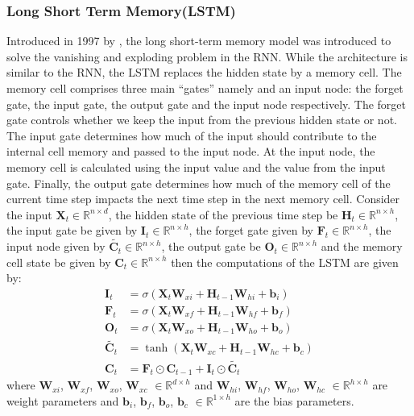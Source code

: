 \subsubsection*{Long Short Term Memory(LSTM)}
Introduced in 1997 by \cite{Hochreiter1997}, the long short-term memory model was introduced to solve the vanishing and exploding problem in the RNN. While the architecture is similar to the RNN, the LSTM replaces the hidden state by a memory cell. The memory cell comprises three main “gates” namely and an input node: the forget gate, the input gate, the output gate  and the input node respectively. The forget gate controls whether we keep the input from the previous hidden state or not.  The input gate determines how much of the input should contribute to the internal cell memory and passed to the input node. At the input node, the memory cell is calculated using the input value and the value from the input gate. Finally, the output gate determines how much of the memory cell of the current time step impacts the next time step in the next memory cell. Consider the input $\mathbf{X}_t \in \mathbb{R}^{n \times d}$, the hidden state of the previous time step be  $\mathbf{H}_t \in \mathbb{R}^{n \times h}$, the input gate be given by $\mathbf{I}_t \in \mathbb{R}^{n \times h}$, the forget gate given by $\mathbf{F}_t \in \mathbb{R}^{n \times h}$, the input node given by $\tilde{\mathbf{C}_t} \in \mathbb{R}^{n \times h}$,  the output gate be $\mathbf{O}_t \in \mathbb{R}^{n \times h}$ and the memory cell state be given by $\mathbf{C}_t \in \mathbb{R}^{n \times h}$ then the computations of the LSTM are given by:
\begin{align}
  \label{eq:LSTM_HS}
  \mathbf{I}_t &= \sigma(\mathbf{X}_t \mathbf{W}_{xi} + \mathbf{H}_{t-1}\mathbf{W}_{hi} + \mathbf{b}_i) \\
  \mathbf{F}_t &= \sigma(\mathbf{X}_t \mathbf{W}_{xf} + \mathbf{H}_{t-1}\mathbf{W}_{hf} + \mathbf{b}_f) \\
  \mathbf{O}_t &= \sigma(\mathbf{X}_t \mathbf{W}_{xo} + \mathbf{H}_{t-1}\mathbf{W}_{ho} + \mathbf{b}_o) \\
  \tilde{\mathbf{C}_t} &= \tanh(\mathbf{X}_t \mathbf{W}_{xc} + \mathbf{H}_{t-1}\mathbf{W}_{hc} + \mathbf{b}_c)\\
  \mathbf{C}_t &= \mathbf{F}_t \odot \mathbf{C}_{t-1} + \mathbf{I}_t \odot \tilde{\mathbf{C}_t}
\end{align}
where $ \mathbf{W}_{xi}$, $ \mathbf{W}_{xf}$, $ \mathbf{W}_{xo}$,  $\mathbf{W}_{xc}$ $\in \mathbb{R}^{d \times h}$ and $ \mathbf{W}_{hi}$, $ \mathbf{W}_{hf}$, $ \mathbf{W}_{ho}$,  $\mathbf{W}_{hc}$ $\in \mathbb{R}^{h \times h}$ are weight parameters and $\mathbf{b}_i$, $\mathbf{b}_f$, $\mathbf{b}_o$, $\mathbf{b}_c$ $\in \mathbb{R}^{1 \times h}$ are the bias parameters.

